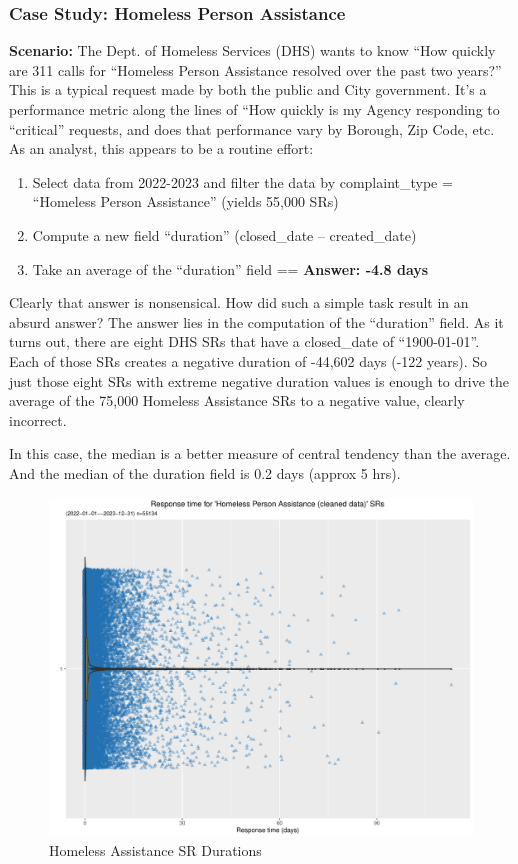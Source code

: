 \documentclass[12pt, titlepage]{article}
\begin{document}
\subsubsection{Case Study: Homeless Person Assistance}
\label{sec:homlessassistance}
	\textbf{Scenario:} The Dept. of Homeless Services (DHS) wants to 
	know ``How quickly are 311 calls for ``Homeless Person Assistance
	resolved over the past two years?'' This is a typical request made by 
	both the public and City government. It's a performance metric along 
	the lines of ``How quickly is my Agency responding to ``critical'' 
	requests, and does that performance vary by Borough, Zip Code, etc. 
	As an analyst, this appears to be a routine effort: 
		
	\begin{enumerate}
	    \item Select data from 2022-2023 and filter the data by 
	    complaint\_type = ``Homeless Person Assistance'' (yields 55,000 SRs)
	    \item Compute a new field ``duration'' (closed\_date – created\_date)
	    \item Take an average of the ``duration'' field == \textbf{Answer:  -4.8 days}  
	\end{enumerate}
		
	Clearly that answer is nonsensical. How did such a simple task result 
	in an absurd answer? The answer lies in the computation of the ``duration'' 
	field. As it turns out, there are eight DHS SRs that have a closed\_date 
	of ``1900-01-01''. Each of those SRs creates a negative duration of -44,602 
	days (-122 years). So just those eight SRs with extreme negative duration 
	values is enough to drive the average of the 75,000 
	Homeless Assistance SRs to a negative value, clearly incorrect.
		
	In this case, the median is a better measure of central tendency than the average. 
	And the median of the duration field is  0.2 days (approx 5 hrs). 
		
	\begin{figure}[tbp]
	 	 \centering
	 	 \includegraphics[width = \textwidth]{homeless_response_time_clean.pdf}
		 \caption{Homeless Assistance SR Durations}
		 \label{fig:homeless}
	\end{figure}
		
\end{document}
